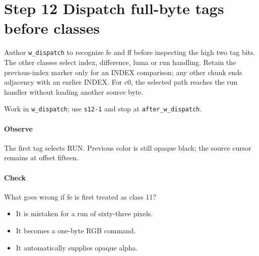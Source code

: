 \section{Step 12 Dispatch full-byte tags before classes}\label{qoi-s12}
Author \texttt{w\_dispatch} to recognize fe and ff before inspecting the high two tag bits. The other classes select index, difference, luma or run handling. Retain the previous-index marker only for an INDEX comparison; any other chunk ends adjacency with an earlier INDEX. For c0, the selected path reaches the run handler without loading another source byte.

Work in \texttt{w\_dispatch}; use \texttt{s12-1} and stop at \texttt{after\_w\_dispatch}.

\paragraph{Observe} The first tag selects RUN. Previous color is still opaque black; the source cursor remains at offset fifteen.

\paragraph{Check} What goes wrong if fe is first treated as class 11?
\begin{itemize}
  \item[A.] It is mistaken for a run of sixty-three pixels.
  \item[B.] It becomes a one-byte RGB command.
  \item[C.] It automatically supplies opaque alpha.
\end{itemize}
